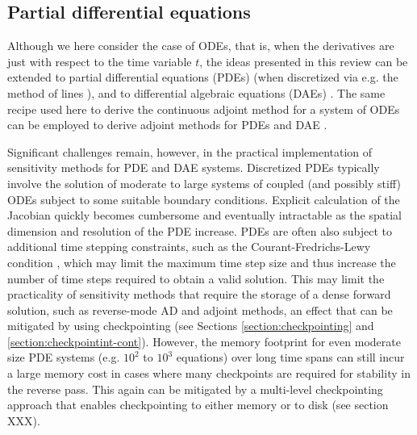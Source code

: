 
\subsection{Partial differential equations}



Although we here consider the case of ODEs, that is, when the derivatives are just with respect to the time variable $t$, the ideas presented in this review can be extended to partial differential equations (PDEs) (when discretized via e.g. the method of lines \cite{ascher2008numerical}), and to differential algebraic equations (DAEs) \cite{hairer-solving-2}.
The same recipe used here to derive the continuous adjoint method for a system of ODEs can be employed to derive adjoint methods for PDEs \cite{Giles_Pierce_2000} and DAE \cite{Cao_Li_Petzold_2002}. 

Significant challenges remain, however, in the practical implementation of sensitivity methods for PDE and DAE systems. 
Discretized PDEs typically involve the solution of moderate to large systems of coupled (and possibly stiff) ODEs subject to some suitable boundary conditions. 
Explicit calculation of the Jacobian quickly becomes cumbersome and eventually intractable as the spatial dimension and resolution of the PDE increase.
PDEs are often also subject to additional time stepping constraints, such as the Courant-Fredrichs-Lewy condition \cite{courantPartialDifferenceEquations1967}, which may limit the maximum time step size and thus increase the number of time steps required to obtain a valid solution. 
This may limit the practicality of sensitivity methods that require the storage of a dense forward solution, such as reverse-mode AD and adjoint methods, an effect that can be mitigated by using checkpointing (see Sections \ref{section:checkpointing} and \ref{section:checkpointint-cont}).
However, the memory footprint for even moderate size PDE systems (e.g. $10^2$ to $10^3$ equations) over long time spans can still incur a large memory cost in cases where many checkpoints are required for stability in the reverse pass. 
This again can be mitigated by a multi-level checkpointing approach that enables checkpointing to either memory or to disk (see section XXX).

